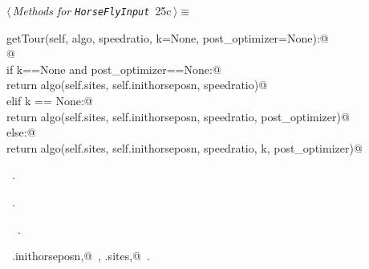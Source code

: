 \documentclass[11.5pt]{report}
\begin{document}
\begin{flushleft} \small\label{scrap31}\raggedright\small
{} $\langle\,${\itshape Methods for \verb|HorseFlyInput|}\nobreak\ {\footnotesize {25c}}$\,\rangle\equiv$
\vspace{-1ex}
\begin{list}{}{} \item
\mbox{}\verb@def getTour(self, algo, speedratio, k=None, post_optimizer=None):@\\
\mbox{}\verb@ @\\
\mbox{}\verb@    if k==None and post_optimizer==None:@\\
\mbox{}\verb@          return algo(self.sites, self.inithorseposn, speedratio)@\\
\mbox{}\verb@    elif k == None:@\\
\mbox{}\verb@          return algo(self.sites, self.inithorseposn, speedratio, post_optimizer)@\\
\mbox{}\verb@    else:@\\
\mbox{}\verb@          return algo(self.sites, self.inithorseposn, speedratio, k, post_optimizer)@\\
\mbox{}\verb@@{\NWsep}
\end{list}
\vspace{-1.5ex}
\footnotesize
\begin{list}{}{\setlength{\itemsep}{-\parsep}\setlength{\itemindent}{-\leftmargin}}
\item \NWtxtMacroDefBy\ .
\item \NWtxtMacroRefIn\ .
\item \NWtxtIdentsDefed\nobreak\  \verb@getTour@\nobreak\ .\item \NWtxtIdentsUsed\nobreak\  \verb@self.inithorseposn,@\nobreak\ , \verb@self.sites,@\nobreak\ .
\item{}
\end{list}
\vspace{4ex}
\end{flushleft}
\end{document}
